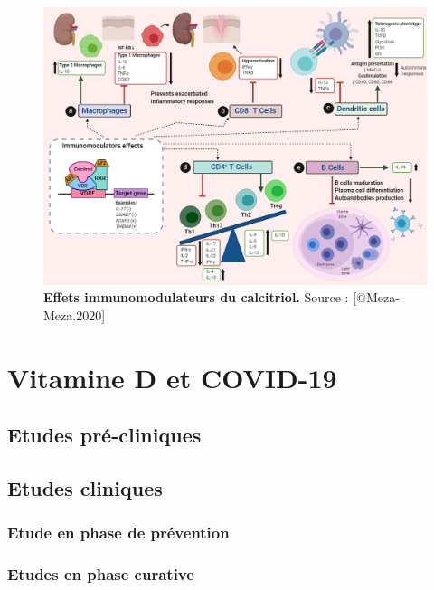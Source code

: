 \documentclass[
  letterpaper,
  DIV=11,
  numbers=noendperiod]{scrartcl}
\begin{document}
\begin{figure}
\includegraphics{figures/calcitriol-immunomodulatory.jpg} 
\caption[\textbf{Effets immunomodulateurs du calcitriol.}]{\textbf{Effets immunomodulateurs du calcitriol.} Source : [@Meza-Meza.2020]}\label{fig:immunomod}
\end{figure}

\hypertarget{vitamine-d-et-covid-19}{%
\section{Vitamine D et COVID-19}\label{vitamine-d-et-covid-19}}

\hypertarget{etudes-pruxe9-cliniques}{%
\subsection{Etudes pré-cliniques}\label{etudes-pruxe9-cliniques}}

\hypertarget{etudes-cliniques}{%
\subsection{Etudes cliniques}\label{etudes-cliniques}}

\hypertarget{etude-en-phase-de-pruxe9vention}{%
\subsubsection{Etude en phase de
prévention}\label{etude-en-phase-de-pruxe9vention}}

\hypertarget{etudes-en-phase-curative}{%
\subsubsection{Etudes en phase
curative}\label{etudes-en-phase-curative}}
\end{document}
